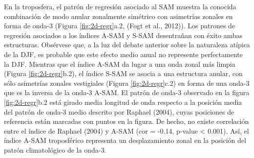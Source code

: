\documentclass[12pt,oneside]{reedthesis}
\begin{document}
En la troposfera, el patrón de regresión asociado al SAM muestra la conocida combinación de modo anular zonalmente simétrico con asimetrías zonales en forma de onda-3 (Figura \ref{fig:2d-regr}a.2, (Fogt et al., 2012)).
Los patrones de regresión asociados a los índices A\nobreakdash-SAM y S\nobreakdash-SAM desentrañan con éxito ambas estructuras.
Obsérvese que, a la luz del debate anterior sobre la naturaleza atípica de la DJF, es probable que este efecto medio anual no represente perfectamente la DJF.
Mientras que el índice A\nobreakdash-SAM da lugar a una onda zonal más limpia (Figura \ref{fig:2d-regr}b.2), el índice S\nobreakdash-SAM se asocia a una estructura anular, con sólo asimetrías zonales vestigiales (Figura \ref{fig:2d-regr}c.2) en forma de una onda-3 que es la inversa de la onda-3 A\nobreakdash-SAM.
El patrón de onda-3 observado en la figura \ref{fig:2d-regr}b.2 está girado media longitud de onda respecto a la posición media del patrón de onda-3 medio descrito por Raphael (2004), cuyas posiciones de referencia están marcadas con puntos en la figura.
De hecho, no existe correlación entre el índice de Raphael (2004) y A\nobreakdash-SAM (cor = -0.14, p-value \textless{} 0.001).
Así, el índice A\nobreakdash-SAM troposférico representa un desplazamiento zonal en la posición del patrón climatológico de la onda-3.
\end{document}
